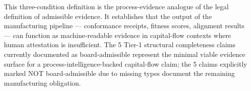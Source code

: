 This three-condition definition is the process-evidence analogue of the legal
definition of admissible evidence. It establishes that the output of the
manufacturing pipeline --- conformance receipts, fitness scores, alignment
results --- can function as machine-readable evidence in capital-flow contexts
where human attestation is insufficient. The 5 Tier-1 structural completeness
claims currently documented as board-admissible represent the minimal viable
evidence surface for a process-intelligence-backed capital-flow claim; the 5
claims explicitly marked NOT board-admissible due to missing types document
the remaining manufacturing obligation.

